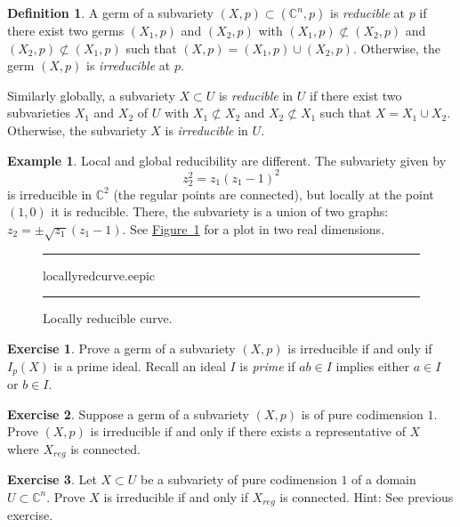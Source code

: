 \documentclass[12pt,openany]{book}
\newcommand{\C}{{\mathbb{C}}}
\newcommand{\myindex}[1]{#1\index{#1}}
\theoremstyle{plain}
\theoremstyle{remark}
\theoremstyle{definition}
\newtheorem{defn}[thm]{Definition}
\newenvironment{exbox}{%
    \def\FrameCommand{\vrule width 1pt \relax\hspace{10pt}}%
    \MakeFramed{\advance\hsize-\width\FrameRestore}%
}{%
    \endMakeFramed
}
\newenvironment{myfig}{%
\begin{figure}[h!t]
\noindent\rule{\textwidth}{0.5pt}\vspace{12pt}\par\centering}%
{\par\noindent\rule{\textwidth}{0.5pt}
\end{figure}}
\theoremstyle{exercise}
\newtheorem{exercise}{Exercise}[section]
\theoremstyle{example}
\newtheorem{example}[thm]{Example}
\newcommand{\figureref}[1]{\hyperref[#1]{Figure~\ref*{#1}}}
\newcommand{\thmref}[1]{\hyperref[#1]{Theorem~\ref*{#1}}}
\begin{document}
\begin{defn}
A germ of a subvariety $(X,p) \subset (\C^n,p)$ is
\emph{\myindex{reducible}} at $p$ if there exist
two germs $(X_1,p)$ and $(X_2,p)$ with
$(X_1,p) \not\subset (X_2,p)$ and
$(X_2,p) \not\subset (X_1,p)$ such that
$(X,p) = (X_1,p) \cup (X_2,p)$.
Otherwise, the germ $(X,p)$ is \emph{\myindex{irreducible}} at $p$.

Similarly globally, a subvariety $X \subset U$ is
\emph{reducible} in $U$ if there exist
two subvarieties
$X_1$ and $X_2$ of $U$ with
$X_1 \not\subset X_2$ and
$X_2 \not\subset X_1$ such that
$X = X_1 \cup X_2$.
Otherwise, the subvariety $X$ is \emph{irreducible} in $U$.
\end{defn}

\begin{example}
\pagebreak[2]
Local and global reducibility are different.
The subvariety given by
\begin{equation*}
z_2^2 = z_1{(z_1-1)}^2
\end{equation*}
is irreducible in $\C^2$ (the regular points are connected), but locally
at the point
$(1,0)$ it is reducible.  There, the subvariety is
a union of two graphs: $z_2 = \pm \sqrt{z_1}(z_1-1)$.
See \figureref{fig:locallyredcurve} for a plot in two real dimensions.

\begin{myfig}
\medskip
{locallyredcurve.eepic}
\bigskip
\caption{Locally reducible curve.\label{fig:locallyredcurve}}
\end{myfig}
\end{example}

\begin{exbox}
\begin{exercise}
Prove a germ of a subvariety $(X,p)$ is irreducible
if and only if $I_p(X)$ is a prime ideal.
Recall an ideal $I$ is \emph{prime}
if $ab \in I$ implies either $a \in I$ or $b
\in I$.
\end{exercise}

\begin{exercise}
Suppose a germ of a subvariety $(X,p)$ is of pure codimension $1$.
Prove $(X,p)$ is irreducible if and only if there
exists a representative of $X$ where $X_{\textit{reg}}$
is connected.  %
\end{exercise}

\begin{exercise}
Let $X \subset U$ be a subvariety of pure codimension $1$ of a domain $U
\subset \C^n$.
Prove $X$ is irreducible if and only if $X_{\mathit{reg}}$
is connected.  Hint: See previous exercise.
\end{exercise}
\end{exbox}
\end{document}
